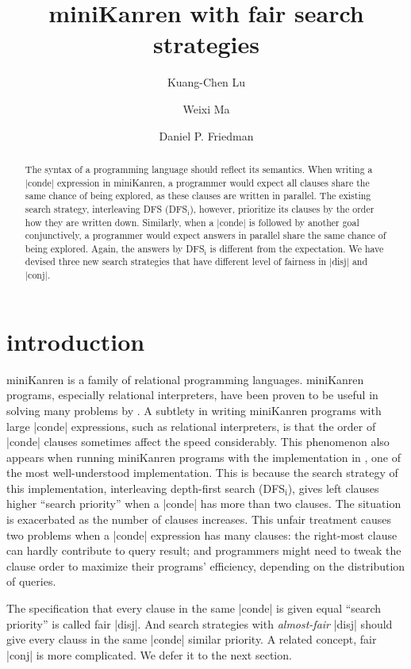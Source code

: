 \documentclass[format=acmlarge, review=true, authordraft=true]{acmart}
\title{miniKanren with fair search strategies}
\author{Kuang-Chen Lu}
\affiliation{Indiana University}
\author{Weixi Ma}
\affiliation{Indiana University}
\author{Daniel P. Friedman}
\affiliation{Indiana University}
\newcommand{\dfsi}[0]{DFS$_\textrm{i}$}
\begin{document}
\begin{abstract}

The syntax of a programming language should reflect its semantics. When writing 
a \scheme|conde| expression in miniKanren, a programmer would expect all clauses 
share the same chance of being explored, as these clauses are written in 
parallel. The existing search strategy, interleaving DFS (DFS$_\textrm{i}$), 
however, prioritize its clauses by the order how they are written down. 
Similarly, when a \scheme|conde| is followed by another goal conjunctively, a 
programmer would expect answers in parallel share the same chance of being 
explored. Again, the answers by DFS$_\textrm{i}$ is different from the 
expectation. We have devised three new search strategies that have different 
level of fairness in \scheme|disj| and \scheme|conj|.

\end{abstract}

\maketitle

\section{introduction}

miniKanren is a family of relational programming languages. miniKanren
programs, especially relational interpreters, have been proven to be
useful in solving many problems by \citet{byrd2017unified}. A subtlety in 
writing miniKanren programs with large \scheme|conde| expressions, such as 
relational interpreters, is that the order of \scheme|conde| clauses sometimes 
affect the speed considerably. This phenomenon also appears when running 
miniKanren programs with the implementation in \citet{friedman_reasoned_2018}, 
one of the most well-understood implementation. This is because the search 
strategy of this implementation, interleaving depth-first search (\dfsi), gives 
left clauses higher ``search priority'' when a \scheme|conde| has more than two 
clauses. The situation is exacerbated as the number of clauses increases. This 
unfair treatment causes two problems when a \scheme|conde| expression has many 
clauses: the right-most clause can hardly contribute to query result; and 
programmers might need to tweak the clause order to maximize their programs' 
efficiency, depending on the distribution of queries.

The specification that every clause in the same \scheme|conde| is given equal 
``search priority'' is called fair \scheme|disj|. And search strategies with 
\emph{almost-fair} \scheme|disj| should give every clauss in the same 
\scheme|conde| similar priority. A related concept, fair \scheme|conj| is more 
complicated. We defer it to the next section.
\end{document}
